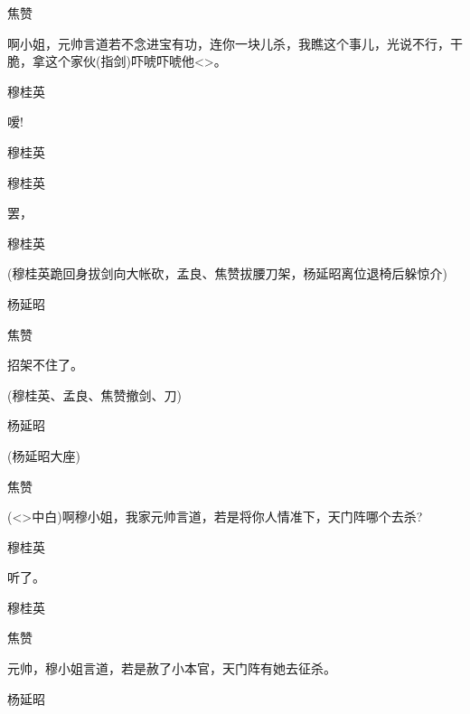 {焦赞

啊小姐，元帅言道若不念进宝有功，连你一块儿杀，我瞧这个事儿，光说不行，干脆，拿这个家伙(指剑)吓唬吓唬他\textless{}\!\textgreater{}。

穆桂英\hspace{20pt}~

嗳!

穆桂英\hspace{20pt}~


穆桂英\hspace{20pt}~

罢，

穆桂英\hspace{20pt}~


(穆桂英跪回身拔剑向大帐砍，孟良、焦赞拔腰刀架，杨延昭离位退椅后躲惊介)

杨延昭\hspace{20pt}~


焦赞\hspace{30pt}~

招架不住了。

(穆桂英、孟良、焦赞撤剑、刀)

杨延昭


(杨延昭大座)

焦赞

(\textless{}\!\textgreater{}中白)啊穆小姐，我家元帅言道，若是将你人情准下，天门阵哪个去杀?

穆桂英\hspace{20pt}~

听了。

穆桂英


焦赞\hspace{30pt}~

元帅，穆小姐言道，若是赦了小本官，天门阵有她去征杀。

杨延昭

}
